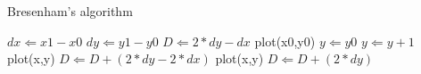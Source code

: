\documentclass{article}
\begin{document}
\begin{algorithm}                      
\caption{Bresenham's algorithm}
\label{alg1}                          
\begin{algorithmic}                  
\STATE $dx \Leftarrow x1-x0$
\STATE $dy \Leftarrow y1-y0$
\STATE $D \Leftarrow 2*dy - dx$
\STATE plot(x0,y0)
\STATE $y \Leftarrow y0$
\STATE      $y \Leftarrow y+1$
\STATE      plot(x,y)
\STATE      $D \Leftarrow D + (2*dy-2*dx)$
\ELSE
\STATE      plot(x,y)
\STATE      $D \Leftarrow D + (2*dy)$
\ENDIF
\ENDFOR
\end{algorithmic}
\end{algorithm}
\end{document}
